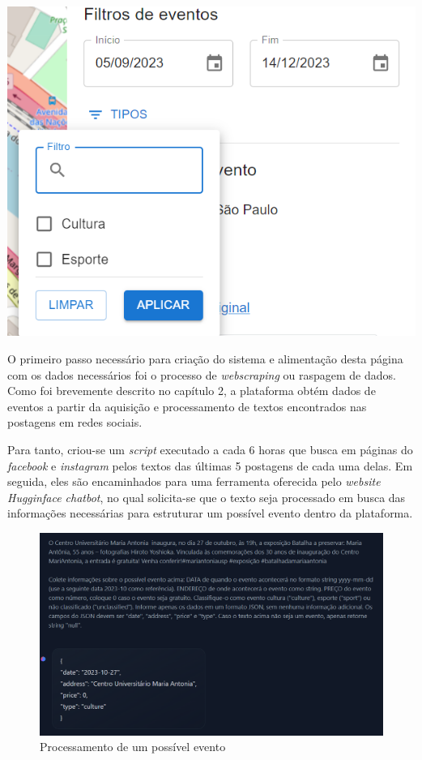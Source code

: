 \begin{multicols}{2}
    \vspace*{\fill}
    \includegraphics[width=.99\linewidth]{figuras/filtro_eventos.png}
    \vspace*{\fill}
\end{multicols}

O primeiro passo necessário para criação do sistema e alimentação desta página
com os dados necessários foi o processo de \textit{webscraping} ou raspagem de
dados. Como foi brevemente descrito no capítulo 2, a plataforma obtém dados de
eventos a partir da aquisição e processamento de textos encontrados nas
postagens em redes sociais.

Para tanto, criou-se um \textit{script} executado a cada 6 horas que busca em
páginas do \textit{facebook} e \textit{instagram} pelos textos das últimas 5
postagens de cada uma delas. Em seguida, eles são encaminhados para uma
ferramenta oferecida pelo \textit{website} \textit{Hugginface chatbot}, no qual
solicita-se que o texto seja processado em busca das informações necessárias
para estruturar um possível evento dentro da plataforma.

\begin{figure}[h]
    \centering
    \includegraphics[width=1\textwidth]{figuras/huggingface-chatbot.png}
    \caption{Processamento de um possível evento}
\end{figure}

